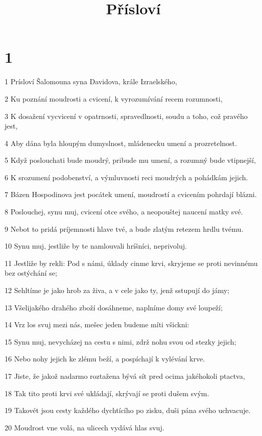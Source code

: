 

\title{Přísloví}

\chapter{1}

\par 1 Prísloví Šalomouna syna Davidova, krále Izraelského,
\par 2 Ku poznání moudrosti a cvicení, k vyrozumívání recem rozumnosti,
\par 3 K dosažení vycvicení v opatrnosti, spravedlnosti, soudu a toho, což pravého jest,
\par 4 Aby dána byla hloupým dumyslnost, mládenecku umení a prozretelnost.
\par 5 Když poslouchati bude moudrý, pribude mu umení, a rozumný bude vtipnejší,
\par 6 K srozumení podobenství, a výmluvnosti reci moudrých a pohádkám jejich.
\par 7 Bázen Hospodinova jest pocátek umení, moudrostí a cvicením pohrdají blázni.
\par 8 Poslouchej, synu muj, cvicení otce svého, a neopouštej naucení matky své.
\par 9 Nebot to pridá príjemnosti hlave tvé, a bude zlatým retezem hrdlu tvému.
\par 10 Synu muj, jestliže by te namlouvali hríšníci, neprivoluj.
\par 11 Jestliže by rekli: Pod s námi, úklady cinme krvi, skryjeme se proti nevinnému bez ostýchání se;
\par 12 Sehltíme je jako hrob za živa, a v cele jako ty, jenž sstupují do jámy;
\par 13 Všelijakého drahého zboží dosáhneme, naplníme domy své loupeží;
\par 14 Vrz los svuj mezi nás, mešec jeden budeme míti všickni:
\par 15 Synu muj, nevycházej na cestu s nimi, zdrž nohu svou od stezky jejich;
\par 16 Nebo nohy jejich ke zlému beží, a pospíchají k vylévání krve.
\par 17 Jiste, že jakož nadarmo roztažena bývá sít pred ocima jakéhokoli ptactva,
\par 18 Tak tito proti krvi své ukládají, skrývají se proti dušem svým.
\par 19 Takovét jsou cesty každého dychtícího po zisku, duši pána svého uchvacuje.
\par 20 Moudrost vne volá, na ulicech vydává hlas svuj.
